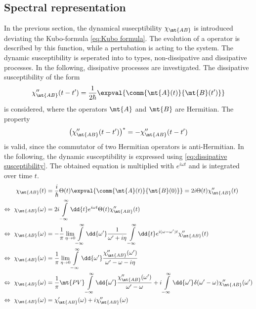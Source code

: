 \subsection{Spectral representation}
\label{subsec:spectral representation}
%
%
In the previous section, the dynamical susecptibility $\chi_{\mt{AB}}$ is introduced deviating the Kubo-formula \eqref{eq:Kubo formula}.
The evolution of a operator is described by this function, while a pertubation is acting to the system.
The dynamic susceptibility is seperated into to types, non-dissipative and dissipative processes.
In the following, dissipative processes are investigated.
The dissipative susceptibility of the form
%
\begin{align}
	\chi''_{\mt{AB}}(t-t') = \frac{1}{2\hbar} \expval{\comm{\mt{A}(t)}{\mt{B}(t')}}
	\label{eq:dissipative susceptibility}
\end{align}
%
is considered, where the operators $\mt{A}$ and $\mt{B}$ are Hermitian.
The property
%
\begin{align}
	\big(\chi''_{\mt{AB}}(t-t')\big)^{*} = - \chi''_{\mt{AB}}(t-t')
	\label{eq:complex conjugated of dissipative susceptibility}
\end{align}
%
is valid, since the commutator of two Hermitian operators is anti-Hermitian.
In the following, the dynamic susceptibility is expressed using \eqref{eq:dissipative susceptibility}.
The obtained equation is multiplied with $e^{i\omega t}$ and is integrated over time $t$.
%
\begin{align}
	\chi_{\mt{AB}}(t) &= \frac{i}{\hbar} \Theta(t) \expval{\comm{\mt{A}(t)}{\mt{B}(0)}} = 2i \Theta(t) \chi''_{\mt{AB}}(t)
	\notag \\
	\Leftrightarrow\ \chi_{\mt{AB}}(\omega) &= 2i \int\limits_{-\infty}^{\infty} \dd{t} e^{i\omega t} \Theta(t) \chi''_{\mt{AB}}(t)
	\notag \\
	\Leftrightarrow\ \chi_{\mt{AB}}(\omega) &= -\frac{1}{\pi} \lim\limits_{\eta \to 0} \int\limits_{-\infty}^{\infty} \dd{\omega'}
 \frac{1}{\omega' + i\eta} \int\limits_{-\infty}^{\infty} \dd{t} e^{i(\omega-\omega')t} \chi''_{\mt{AB}}(t)
 	\notag \\
	\Leftrightarrow\ \chi_{\mt{AB}}(\omega) &= \frac{1}{\pi} \lim\limits_{\eta \to 0} \int\limits_{-\infty}^{\infty} \dd{\omega'}
 \frac{\chi''_{\mt{AB}}(\omega')}{\omega' - \omega - i\eta} 
 	\notag \\
	\Leftrightarrow\ \chi_{\mt{AB}}(\omega) &= \frac{1}{\pi} \mt{PV} \int\limits_{-\infty}^{\infty} \dd{\omega'}
 \frac{\chi''_{\mt{AB}}(\omega')}{\omega' - \omega} + i \int\limits_{-\infty}^{\infty} \dd{\omega'} \delta(\omega' - \omega) \chi''_{\mt{AB}}(\omega')
 	\notag \\
	\Leftrightarrow\ \chi_{\mt{AB}}(\omega) &= \chi'_{\mt{AB}}(\omega) + i \chi''_{\mt{AB}}(\omega)
	\label{eq:splitting susceptibility into real and imaginary part}
\end{align}
